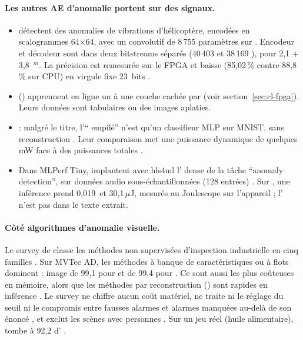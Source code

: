 \paragraph{Les autres AE d'anomalie portent sur des signaux.}
\begin{itemize}
  \item \citet{2022-malviya-edge-compatible-convolutional-autoencoder-implemented}
    détectent des anomalies de vibrations d'hélicoptère, encodées en scalogrammes
    64$\times$64, avec un  convolutif de 8\,755 paramètres sur . Encodeur et
    décodeur sont dans deux bitstreams séparés (40\,403 et 38\,169 ), pour 2,1 + 3,8\,
    $^{m}$. La précision est remesurée sur le FPGA et baisse (85,02\,\%
    contre 88,8\,\% sur CPU) en virgule fixe 23~bits .
  \item \citet{2019-tsukada-neural-network-device-learning-anomaly} () apprennent en
    ligne un  à une couche cachée par  (voir
    section~\ref{sec:cl-fpga}). Leurs données sont tabulaires ou des images aplaties.
  \item \citet{2019-coutinho-deep-neural-network-hardware-implementation} : malgré le
    titre, l'\enquote{ empilé} n'est qu'un classifieur MLP sur MNIST, sans
    reconstruction . Leur comparaison met une puissance dynamique de
    quelques mW face à des puissances totales .
  \item Dans MLPerf Tiny, \citet{arxiv-2206.11791-open-source-fpga-ml-codesign}\pp{}
    implantent avec hls4ml l' dense de la tâche \enquote{anomaly detection}, sur
    données audio sous-échantillonnées (128 entrées) . Sur , une inférence prend 0,019\, et
    30,1\,$\mu$J, mesurés au Joulescope sur l'appareil  ; l'
    n'est pas dans le texte extrait.
\end{itemize}

\paragraph{Côté algorithmes d'anomalie visuelle.} Le survey de
\citet{2023-cui-survey-unsupervised-anomaly-detection-algorithms} classe les méthodes non
supervisées d'inspection industrielle en cinq familles . Sur MVTec AD,
les méthodes à banque de caractéristiques ou à flots dominent :  image de 99,1 pour
 et de 99,4 pour  . Ce sont aussi
les plus coûteuses en mémoire, alors que les méthodes par reconstruction () sont rapides
en inférence . Le survey ne chiffre aucun coût matériel, ne traite ni le réglage du
seuil ni le compromis entre fausses alarmes et alarmes manquées au-delà de son énoncé
, et exclut les scènes avec personnes . Sur un jeu réel (huile
alimentaire),  tombe à 92,2 d' .

